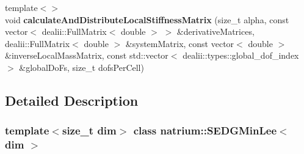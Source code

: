 \begin{DoxyCompactItemize}
\item 
\hypertarget{classnatrium_1_1SEDGMinLee_a7d20a56bbe96969ef037be2a6f47d12d}{
{\footnotesize template$<$$>$ }\\void {\bfseries calculateAndDistributeLocalStiffnessMatrix} (size\_\-t alpha, const vector$<$ dealii::FullMatrix$<$ double $>$ $>$ \&derivativeMatrices, dealii::FullMatrix$<$ double $>$ \&systemMatrix, const vector$<$ double $>$ \&inverseLocalMassMatrix, const std::vector$<$ dealii::types::global\_\-dof\_\-index $>$ \&globalDoFs, size\_\-t dofsPerCell)}
\label{classnatrium_1_1SEDGMinLee_a7d20a56bbe96969ef037be2a6f47d12d}

\end{DoxyCompactItemize}


\subsection{Detailed Description}
\subsubsection*{template$<$size\_\-t dim$>$ class natrium::SEDGMinLee$<$ dim $>$}


